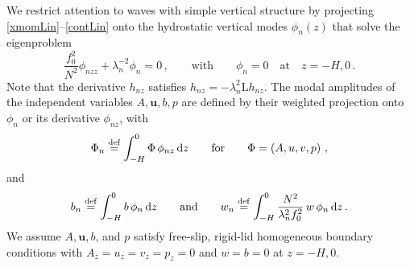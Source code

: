 \documentclass[12pt, oneside]{article}
\newcommand{\com}{\, ,}
\newcommand{\per}{\, .}
\newcommand{\defn}{\ensuremath{\stackrel{\mathrm{def}}{=}}}
\newcommand{\beq}{\begin{equation}}
\newcommand{\eeq}{\end{equation}}
\newcommand{\bu}{\boldsymbol u}
\newcommand{\id}{{\, \rm d}}
\renewcommand{\L}{\mathrm{L}}
\newcommand{\mode}{\phi}
\begin{document}
We restrict attention to waves with simple vertical structure by projecting \eqref{xmomLin}--\eqref{contLin} onto the hydrostatic vertical modes $\mode_n(z)$ that solve the eigenproblem
\beq
\frac{f_0^2}{N^2} \mode_{nzz} + \lambda_n^{-2} \mode_n = 0 \com \qquad \text{with} \qquad \mode_n = 0 \quad \text{at} \quad z = -H, 0 \per
\label{modalEigenproblem}
\eeq
Note that the derivative $h_{nz}$ satisfies $h_{nz} = - \lambda_n^2 \L h_{nz}$.  The modal amplitudes of the independent variables $A, \bu, b, p$ are defined by their weighted projection onto $\mode_n$ or its derivative $\mode_{nz}$, with
\beq
\Phi_n \defn \int_{-H}^0 \Phi \, \mode_{nz} \id z  \qquad \text{for} \qquad \Phi = \left (A, u, v, p \right ) \com
\label{modezDef}
\eeq
and
\beq
b_n \defn \int_{-H}^0 b \, \mode_n \id z  \qquad \text{and} \qquad w_n \defn \int_{-H}^0 \frac{N^2}{\lambda_n^2 f_0^2} \, w \, \mode_n \id z \per
\eeq 
We assume $A, \bu, b$, and $p$ satisfy free-slip, rigid-lid homogeneous boundary conditions with $A_z = u_z = v_z = p_z = 0$ and $w= b = 0$ at $z = -H, 0$.
 
\end{document}
